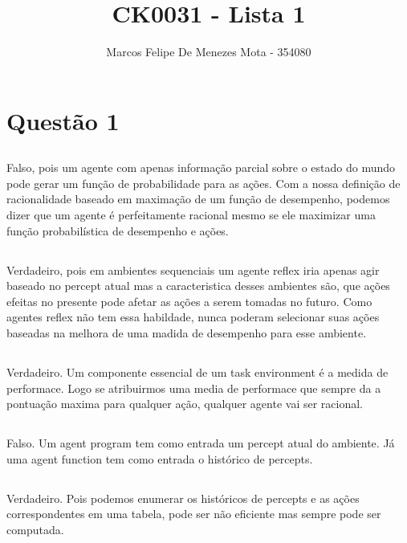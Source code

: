 \documentclass[a4paper,12pt]{article}
\title{CK0031 - Lista 1}
\author{Marcos Felipe De Menezes Mota - 354080}
\date{}
\begin{document}
\maketitle
\section{Questão 1}

\subsection{}
Falso, pois um agente com apenas informação parcial sobre o estado do mundo pode gerar um função de probabilidade para as ações. Com a nossa definição de racionalidade baseado em maximação de um função de desempenho, podemos dizer que um agente é perfeitamente racional mesmo se ele maximizar uma função probabilística de desempenho e ações.

\subsection{}
Verdadeiro, pois em ambientes sequenciais um agente reflex iria apenas agir baseado no percept atual mas a caracteristica desses ambientes são, que ações efeitas no presente pode afetar as ações a serem tomadas no futuro. Como agentes reflex não tem essa habildade, nunca poderam selecionar suas ações baseadas na melhora de uma madida de desempenho para esse ambiente.

\subsection{}
Verdadeiro. Um componente essencial de um task environment é a medida de performace. Logo se atribuirmos uma media de performace que sempre da a pontuação maxima para qualquer ação, qualquer agente vai ser racional.

\subsection{}
Falso. Um agent program tem como entrada um percept atual do ambiente. Já uma agent function tem como entrada o histórico de percepts.

\subsection{}
Verdadeiro. Pois podemos enumerar os históricos de percepts e as ações correspondentes em uma tabela, pode ser não eficiente mas sempre pode ser computada.
\end{document}
